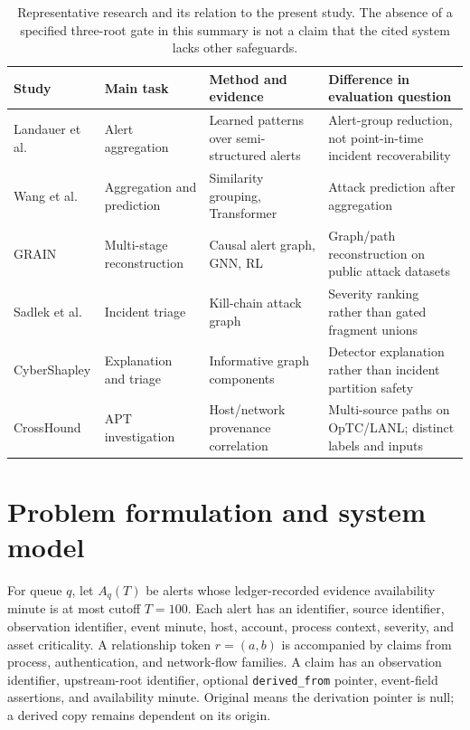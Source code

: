 \begin{table}[t]\centering\footnotesize\caption{Representative research and its relation to the present study. The absence of a specified three-root gate in this summary is not a claim that the cited system lacks other safeguards.}\label{tab:prior}
\begin{tabularx}{\textwidth}{@{}p{}p{}Y Y@{}}\toprule
Study & Main task & Method and evidence & Difference in evaluation question\\\midrule
Landauer et al. \cite{landauer2022} & Alert aggregation & Learned patterns over semi-structured alerts & Alert-group reduction, not point-in-time incident recoverability\\
Wang et al. \cite{wang2024} & Aggregation and prediction & Similarity grouping, Transformer & Attack prediction after aggregation\\
GRAIN \cite{grain2025} & Multi-stage reconstruction & Causal alert graph, GNN, RL & Graph/path reconstruction on public attack datasets\\
Sadlek et al. \cite{sadlek2025} & Incident triage & Kill-chain attack graph & Severity ranking rather than gated fragment unions\\
CyberShapley \cite{malach2025} & Explanation and triage & Informative graph components & Detector explanation rather than incident partition safety\\
CrossHound \cite{crosshound2026} & APT investigation & Host/network provenance correlation & Multi-source paths on OpTC/LANL; distinct labels and inputs\\\bottomrule
\end{tabularx}\end{table}



\section{Problem formulation and system model}
For queue $q$, let $A_q(T)$ be alerts whose ledger-recorded evidence availability minute is at most cutoff $T=100$. Each alert has an identifier, source identifier, observation identifier, event minute, host, account, process context, severity, and asset criticality. A relationship token $r=(a,b)$ is accompanied by claims from process, authentication, and network-flow families. A claim has an observation identifier, upstream-root identifier, optional \texttt{derived\_from} pointer, event-field assertions, and availability minute. Original means the derivation pointer is null; a derived copy remains dependent on its origin.

